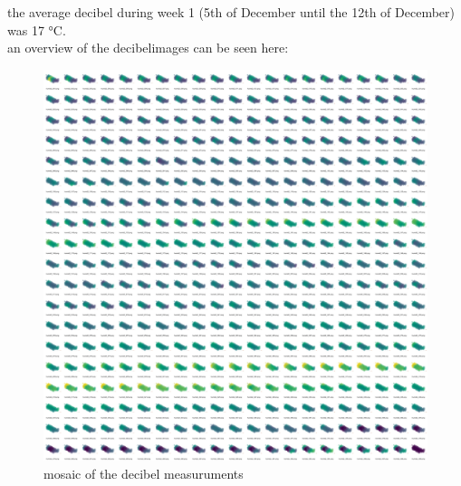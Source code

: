 \FloatBarrier 
the average decibel during week 1 (5th of December until the 12th of December) was 17 °C. \\an overview of the decibelimages can be seen here:\begin{figure}[hbt!] 
\centering 
\includegraphics[width=\textwidth]{reports/current_report/images/montage_decibel.jpg}  
\caption{mosaic of the decibel measuruments} 
\end{figure} 
\FloatBarrier 
